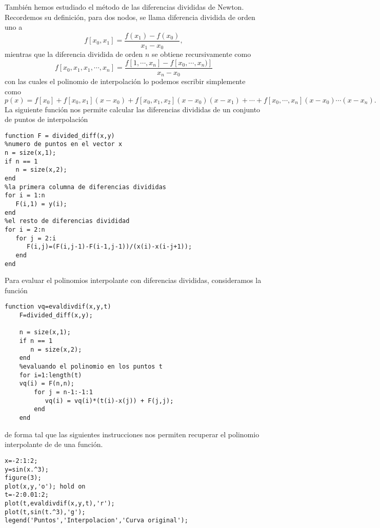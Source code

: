 \documentclass[12pt,letterpaper]{article}
\begin{document}
Tambi\'en hemos estudiado el m\'etodo de las diferencias divididas de Newton. Recordemos su definici\'on, para dos nodos, se llama diferencia dividida de orden uno a
$$
f[x_0,x_1]=\frac{f(x_1)-f(x_0)}{x_1-x_0},
$$
mientras que la diferencia dividida de orden $n$ se obtiene recursivamente como
$$
f[x_0,x_1,x_1,\cdots,x_n]=\frac{f[1,\cdots,x_n]-f[x_0,\cdots,x_n)]}{x_n-x_0}
$$
con las cuales el polinomio de interpolaci\'on lo podemos escribir simplemente como
$$
p(x)=f[x_0]+f[x_0,x_1](x-x_0)+f[x_0,x_1,x_2](x-x_0)(x-x_1)+ \cdots + f[x_0,\cdots,x_n](x-x_0)\cdots (x-x_n).
$$
La siguiente funci\'on nos permite calcular las diferencias divididas de un conjunto de puntos de interpolaci\'on
\begin{verbatim}
function F = divided_diff(x,y)
%numero de puntos en el vector x
n = size(x,1);
if n == 1
   n = size(x,2);
end
%la primera columna de diferencias divididas
for i = 1:n
   F(i,1) = y(i);
end
%el resto de diferencias divididad
for i = 2:n
   for j = 2:i
      F(i,j)=(F(i,j-1)-F(i-1,j-1))/(x(i)-x(i-j+1));
   end
end
\end{verbatim}
Para evaluar el polinomios interpolante con diferencias divididas, consideramos la funci\'on
\begin{verbatim}
function vq=evaldivdif(x,y,t)
    F=divided_diff(x,y);

	n = size(x,1);
    if n == 1
       n = size(x,2);
    end
    %evaluando el polinomio en los puntos t
    for i=1:length(t)
    vq(i) = F(n,n);
        for j = n-1:-1:1
           vq(i) = vq(i)*(t(i)-x(j)) + F(j,j);
        end
    end
\end{verbatim}
de forma tal que las siguientes instrucciones nos permiten recuperar el polinomio interpolante de de una funci\'on.
\begin{verbatim}
x=-2:1:2;
y=sin(x.^3);
figure(3);
plot(x,y,'o'); hold on
t=-2:0.01:2;
plot(t,evaldivdif(x,y,t),'r');
plot(t,sin(t.^3),'g');
legend('Puntos','Interpolacion','Curva original');
\end{verbatim}
\end{document}

